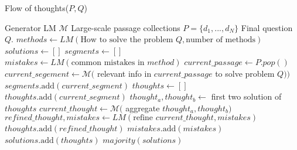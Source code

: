 \documentclass{article}
\begin{document}
\begin{algorithm}
    \caption{Flow of thoughts($P,Q$)}\label{alg:cap}
    \begin{algorithmic}
        \Require Generator LM $\mathcal{M}$
        \Require Large-scale passage collections $P=\{d_1, . . . , d_N \}$
        \Require Final question $Q$.
        \State $methods\gets LM(\text{How to solve the problem } Q, \text{number of methods})$
        \State $solutions\gets []$
            \State $segments \gets []$
            \State $mistakes\gets LM(\text{common mistakes in } method)$
                    \State $current\_passage\gets P.pop()$
                    \State $current\_segement\gets \mathcal{M}($ relevant info in $current\_passage$ to solve problem $Q))$
                    \State $segments.\text{add}(current\_segment)$
                \EndIf
            \EndWhile
            \State $thoughts\gets[]$
                \State $thoughts.\text{add}(current\_segment)$
            \EndFor
                \State $thought_a,thought_b\gets$ first two solution of $thoughts$
                \State $current\_thought\gets\mathcal{M}($ aggregate $thought_a,thought_b)$ 
                \State $refined\_thought,mistakes\gets LM(\text{refine } current\_thought, mistakes)$
                \State $thoughts.\text{add}(refined\_thought)$
                \State $mistakes.\text{add}(mistakes)$
            \EndWhile
            \State $solutions.\text{add}(thoughts)$
        \EndFor
        \State \Return $majority(solutions)$

        
    \end{algorithmic}
    \end{algorithm}
\end{document}

